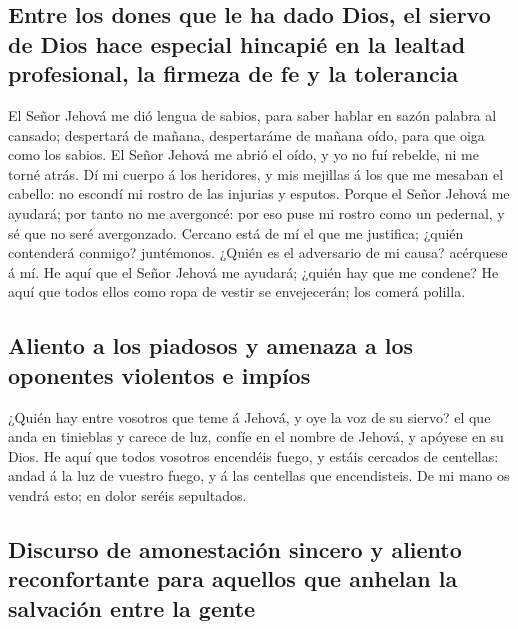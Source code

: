 \hypertarget{entre-los-dones-que-le-ha-dado-dios-el-siervo-de-dios-hace-especial-hincapiuxe9-en-la-lealtad-profesional-la-firmeza-de-fe-y-la-tolerancia}{%
\subsection{Entre los dones que le ha dado Dios, el siervo de Dios hace
especial hincapié en la lealtad profesional, la firmeza de fe y la
tolerancia}\label{entre-los-dones-que-le-ha-dado-dios-el-siervo-de-dios-hace-especial-hincapiuxe9-en-la-lealtad-profesional-la-firmeza-de-fe-y-la-tolerancia}}

 El Señor Jehová me dió lengua de sabios, para saber hablar
en sazón palabra al cansado; despertará de mañana, despertaráme de
mañana oído, para que oiga como los sabios.  El Señor Jehová
me abrió el oído, y yo no fuí rebelde, ni me torné atrás. 
Dí mi cuerpo á los heridores, y mis mejillas á los que me mesaban el
cabello: no escondí mi rostro de las injurias y esputos. 
Porque el Señor Jehová me ayudará; por tanto no me avergoncé: por eso
puse mi rostro como un pedernal, y sé que no seré avergonzado.
 Cercano está de mí el que me justifica; ¿quién contenderá
conmigo? juntémonos. ¿Quién es el adversario de mi causa? acérquese á
mí.  He aquí que el Señor Jehová me ayudará; ¿quién hay que
me condene? He aquí que todos ellos como ropa de vestir se envejecerán;
los comerá polilla.

\hypertarget{aliento-a-los-piadosos-y-amenaza-a-los-oponentes-violentos-e-impuxedos}{%
\subsection{Aliento a los piadosos y amenaza a los oponentes violentos e
impíos}\label{aliento-a-los-piadosos-y-amenaza-a-los-oponentes-violentos-e-impuxedos}}

 ¿Quién hay entre vosotros que teme á Jehová, y oye la voz
de su siervo? el que anda en tinieblas y carece de luz, confíe en el
nombre de Jehová, y apóyese en su Dios.  He aquí que todos
vosotros encendéis fuego, y estáis cercados de centellas: andad á la luz
de vuestro fuego, y á las centellas que encendisteis. De mi mano os
vendrá esto; en dolor seréis sepultados.

\hypertarget{discurso-de-amonestaciuxf3n-sincero-y-aliento-reconfortante-para-aquellos-que-anhelan-la-salvaciuxf3n-entre-la-gente}{%
\subsection{Discurso de amonestación sincero y aliento reconfortante
para aquellos que anhelan la salvación entre la
gente}\label{discurso-de-amonestaciuxf3n-sincero-y-aliento-reconfortante-para-aquellos-que-anhelan-la-salvaciuxf3n-entre-la-gente}}

